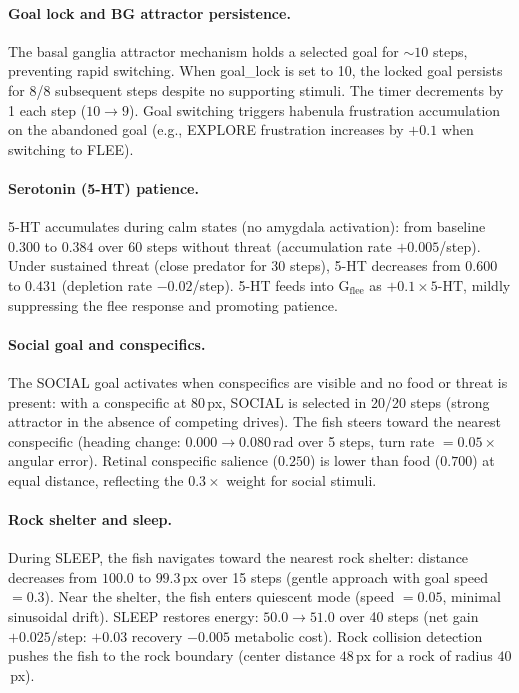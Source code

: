 \documentclass[11pt,a4paper]{article}
\begin{document}
\paragraph{Goal lock and BG attractor persistence.}
The basal ganglia attractor mechanism holds a selected goal for $\sim\!10$
steps, preventing rapid switching. When goal\_lock is set to 10, the
locked goal persists for 8/8 subsequent steps despite no supporting stimuli.
The timer decrements by 1 each step ($10 \to 9$). Goal switching triggers
habenula frustration accumulation on the abandoned goal (e.g., EXPLORE
frustration increases by $+0.1$ when switching to FLEE).

\paragraph{Serotonin (5-HT) patience.}
5-HT accumulates during calm states (no amygdala activation): from
baseline $0.300$ to $0.384$ over 60 steps without threat
(accumulation rate $+0.005$/step). Under sustained threat (close predator
for 30 steps), 5-HT decreases from $0.600$ to $0.431$
(depletion rate $-0.02$/step). 5-HT feeds into G$_\text{flee}$ as
$+0.1 \times \text{5-HT}$, mildly suppressing the flee response
and promoting patience.

\paragraph{Social goal and conspecifics.}
The SOCIAL goal activates when conspecifics are visible and
no food or threat is present: with a conspecific at $80$\,px,
SOCIAL is selected in 20/20 steps (strong attractor in the absence of
competing drives). The fish steers toward the nearest conspecific
(heading change: $0.000 \to 0.080$\,rad over 5 steps, turn rate
$= 0.05 \times$ angular error). Retinal conspecific salience ($0.250$)
is lower than food ($0.700$) at equal distance, reflecting the $0.3\times$
weight for social stimuli.

\paragraph{Rock shelter and sleep.}
During SLEEP, the fish navigates toward the nearest rock shelter:
distance decreases from $100.0$ to $99.3$\,px over 15 steps
(gentle approach with goal speed $= 0.3$). Near the shelter,
the fish enters quiescent mode (speed $= 0.05$, minimal sinusoidal drift).
SLEEP restores energy: $50.0 \to 51.0$ over 40 steps (net gain
$+0.025$/step: $+0.03$ recovery $-0.005$ metabolic cost).
Rock collision detection pushes the fish to the rock boundary
(center distance $48$\,px for a rock of radius $40$\,px).
\end{document}
